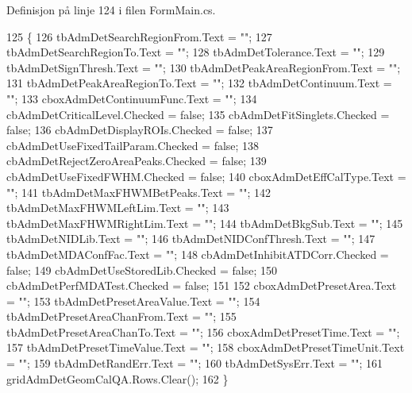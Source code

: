 Definisjon på linje 124 i filen Form\+Main.\+cs.


\begin{DoxyCode}
125         \{
126             tbAdmDetSearchRegionFrom.Text = \textcolor{stringliteral}{""};
127             tbAdmDetSearchRegionTo.Text = \textcolor{stringliteral}{""};
128             tbAdmDetTolerance.Text = \textcolor{stringliteral}{""};
129             tbAdmDetSignThresh.Text = \textcolor{stringliteral}{""};
130             tbAdmDetPeakAreaRegionFrom.Text = \textcolor{stringliteral}{""};
131             tbAdmDetPeakAreaRegionTo.Text = \textcolor{stringliteral}{""};
132             tbAdmDetContinuum.Text = \textcolor{stringliteral}{""};
133             cboxAdmDetContinuumFunc.Text = \textcolor{stringliteral}{""};
134             cbAdmDetCriticalLevel.Checked = \textcolor{keyword}{false};
135             cbAdmDetFitSinglets.Checked = \textcolor{keyword}{false};
136             cbAdmDetDisplayROIs.Checked = \textcolor{keyword}{false};
137             cbAdmDetUseFixedTailParam.Checked = \textcolor{keyword}{false};
138             cbAdmDetRejectZeroAreaPeaks.Checked = \textcolor{keyword}{false};
139             cbAdmDetUseFixedFWHM.Checked = \textcolor{keyword}{false};
140             cboxAdmDetEffCalType.Text = \textcolor{stringliteral}{""};
141             tbAdmDetMaxFHWMBetPeaks.Text = \textcolor{stringliteral}{""};
142             tbAdmDetMaxFHWMLeftLim.Text = \textcolor{stringliteral}{""};
143             tbAdmDetMaxFHWMRightLim.Text = \textcolor{stringliteral}{""};
144             tbAdmDetBkgSub.Text = \textcolor{stringliteral}{""};
145             tbAdmDetNIDLib.Text = \textcolor{stringliteral}{""};
146             tbAdmDetNIDConfThresh.Text = \textcolor{stringliteral}{""};
147             tbAdmDetMDAConfFac.Text = \textcolor{stringliteral}{""};
148             cbAdmDetInhibitATDCorr.Checked = \textcolor{keyword}{false};
149             cbAdmDetUseStoredLib.Checked = \textcolor{keyword}{false};
150             cbAdmDetPerfMDATest.Checked = \textcolor{keyword}{false};
151 
152             cboxAdmDetPresetArea.Text = \textcolor{stringliteral}{""};
153             tbAdmDetPresetAreaValue.Text = \textcolor{stringliteral}{""};
154             tbAdmDetPresetAreaChanFrom.Text = \textcolor{stringliteral}{""};
155             tbAdmDetPresetAreaChanTo.Text = \textcolor{stringliteral}{""};
156             cboxAdmDetPresetTime.Text = \textcolor{stringliteral}{""};
157             tbAdmDetPresetTimeValue.Text = \textcolor{stringliteral}{""};
158             cboxAdmDetPresetTimeUnit.Text = \textcolor{stringliteral}{""};
159             tbAdmDetRandErr.Text = \textcolor{stringliteral}{""};
160             tbAdmDetSysErr.Text = \textcolor{stringliteral}{""};
161             gridAdmDetGeomCalQA.Rows.Clear();
162         \}
\end{DoxyCode}
